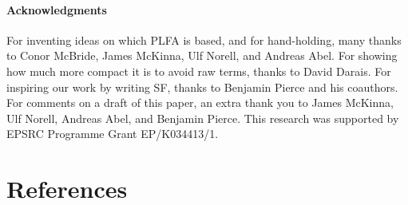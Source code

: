 \documentclass[preprint,authoryear]{elsarticle}
\begin{document}
\paragraph{Acknowledgments}

For inventing ideas on which PLFA is based, and for hand-holding, many thanks to
Conor McBride, James McKinna, Ulf Norell, and Andreas Abel.  For showing how
much more compact it is to avoid raw terms, thanks to David Darais.  For
inspiring our work by writing SF, thanks to Benjamin Pierce and his coauthors.
For comments on a draft of this paper, an extra thank you to James McKinna, Ulf
Norell, Andreas Abel, and Benjamin Pierce. This research was supported by EPSRC
Programme Grant EP/K034413/1.


\section*{References}



\end{document}
